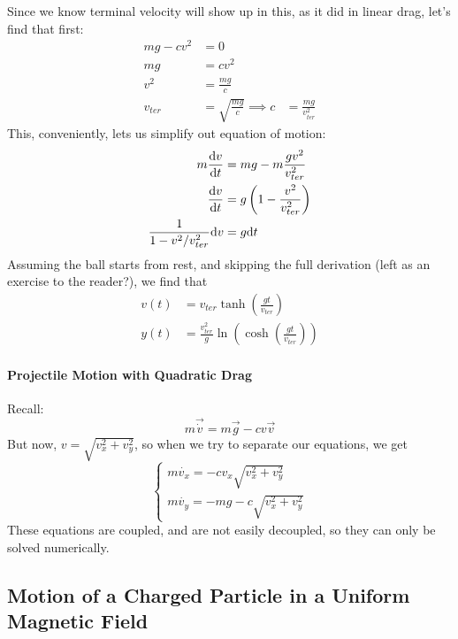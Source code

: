 \documentclass[a4paper]{article}
\begin{document}
Since we know terminal velocity will show up in this, as it did in linear
drag, let's find that first:
\begin{align*}
    mg-cv^2 &= 0\\
    mg &= cv^2\\
    v^2 &= \frac{mg}{c}\\
    v_{ter} &= \sqrt{\frac{mg}{c}}
    \implies c &= \frac{mg}{v_{ter}^2}
\end{align*}
This, conveniently, lets us simplify out equation of motion:
\begin{align*}
    m\frac{\mathrm{d} v}{\mathrm{d} t} &= mg-m\frac{gv^2}{v_{ter}^2}\\
    \frac{\mathrm{d} v}{\mathrm{d} t} &= g\left(1-\frac{v^2}{v_{ter}^2}\right)\\
    \frac{1}{1-v^2/v_{ter}^2}\mathrm{d} v &= g \mathrm{d} t\\
\end{align*}
Assuming the ball starts from rest, and skipping the full derivation
(left as an exercise to the reader?), we find that
\begin{align*}
    v(t) &= v_{ter}\tanh\left(\frac{gt}{v_{ter}}\right)\\
    y(t) &= \frac{v_{ter}^2}{g}\ln\left(\cosh\left(\frac{gt}{v_{ter}}\right)\right)
\end{align*}

\paragraph{Projectile Motion with Quadratic Drag}
Recall:
\[ 
    m\vec{\dot{v}} = m\vec{g} - cv\vec{v}
\]
But now, $v = \sqrt{v_x^2+v_y^2}$, so when we try to separate our equations,
we get
\[
    \begin{cases}
        m\dot{v_x} = -cv_x\sqrt{v_x^2+v_y^2}\\
        m\dot{v_y} = -mg-c\sqrt{v_x^2+v_y^2}
    \end{cases}
\]
These equations are coupled, and are not easily decoupled, so they can only
be solved numerically.

\subsection{Motion of a Charged Particle in a Uniform Magnetic Field}
\end{document}

